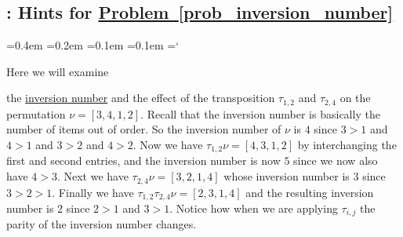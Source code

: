 
\subsection{\elemMatDetTitle: Hints for \hyperref[prob_inversion_number]{Problem~\ref*{prob_inversion_number}}}

{\ttfamily
{}\font=0.4em
\font=0.2em
\font=0.1em
\font=0.1em
\hyphenchar\font=`\-


\hypertarget{scripts_elementary_matrices_determinants_hint}{Here we will examine} the \hyperlink{inversion_number}{inversion number} and the effect of the transposition $\tau_{1,2}$ and $\tau_{2,4}$ on the permutation $\nu = [3, 4, 1, 2]$. Recall that the inversion number is basically the number of items out of order. So the inversion number of $\nu$ is $4$ since $3 > 1$ and $4 > 1$ and $3 > 2$ and $4 > 2$. Now we have $\tau_{1,2} \nu = [4, 3, 1, 2]$ by interchanging the first and second entries, and the inversion number is now $5$ since we now also have $4 > 3$. Next we have $\tau_{2,4} \nu = [3, 2, 1, 4]$ whose inversion number is $3$ since $3 > 2 > 1$. Finally we have $\tau_{1,2} \tau_{2,4} \nu = [2, 3, 1, 4]$ and the resulting inversion number is $2$ since $2 > 1$ and $3 > 1$. Notice how when we are applying $\tau_{i,j}$ the parity of the inversion number changes.


} %

\newpage
